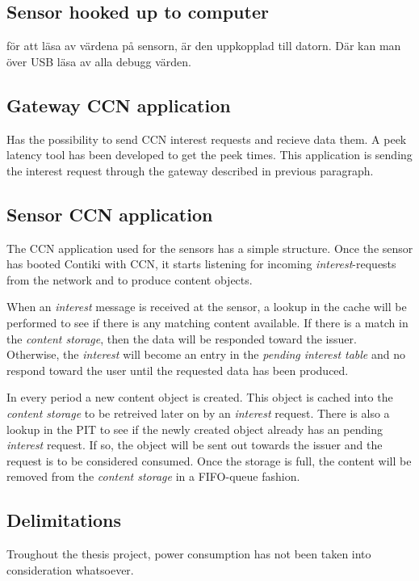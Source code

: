 \subsection{Sensor hooked up to computer}
för att läsa av värdena på sensorn, är den uppkopplad till datorn. Där kan man över USB läsa av alla debugg värden.

\subsection{Gateway CCN application}
Has the possibility to send CCN interest requests and recieve data them. A peek latency tool has been developed to get the peek times.
This application is sending the interest request through the gateway described in previous paragraph.

\subsection{Sensor CCN application}
The CCN application used for the sensors has a simple structure. Once the sensor has booted Contiki with CCN, it starts listening for incoming \textit{interest}-requests from the network and to produce content objects.

When an \textit{interest} message is received at the sensor, a lookup in the cache will be performed to see if there is any matching content available. If there is a match in the \textit{content storage}, then the data will be responded toward the issuer. Otherwise, the \textit{interest} will become an entry in the \textit{pending interest table} and no respond toward the user until the requested data has been produced.

In every period a new content object is created. This object is cached into the \textit{content storage} to be retreived later on by an \textit{interest} request. There is also a lookup in the PIT to see if the newly created object already has an pending \textit{interest} request. If so, the object will be sent out towards the issuer and the request is to be considered consumed. Once the storage is full, the content will be removed from the \textit{content storage} in a FIFO-queue fashion.



\subsection{Delimitations}
Troughout the thesis project, power consumption has not been taken into consideration whatsoever. 




